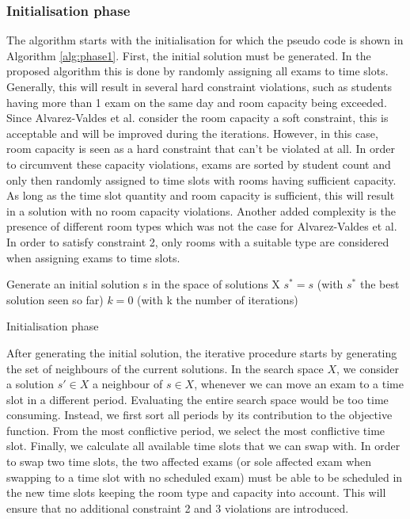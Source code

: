 \subsubsection{Initialisation phase}
The algorithm starts with the initialisation for which the pseudo code is shown in Algorithm \ref{alg:phase1}. First, the initial solution must be generated. In the proposed algorithm this is done by randomly assigning all exams to time slots. Generally, this will result in several hard constraint violations, such as students having more than 1 exam on the same day and room capacity being exceeded. Since Alvarez-Valdes et al. consider the room capacity a soft constraint, this is acceptable and will be improved during the iterations. However, in this case, room capacity is seen as a hard constraint that can't be violated at all. In order to circumvent these capacity violations, exams are sorted by student count and only then randomly assigned to time slots with rooms having sufficient capacity. As long as the time slot quantity and room capacity is sufficient, this will result in a solution with no room capacity violations. Another added complexity is the presence of different room types which was not the case for Alvarez-Valdes et al. In order to satisfy constraint 2, only rooms with a suitable type are considered when assigning exams to time slots.

\begin{algorithm}
 Generate an initial solution s in the space of solutions X\;
 $s^* = s$ (with $s^*$ the best solution seen so far)\;
 $k = 0$ (with k the number of iterations)\;

\caption{Initialisation phase}
\label{alg:phase1}
\end{algorithm}

After generating the initial solution, the iterative procedure starts by generating the set of neighbours of the current solutions. In the search space $X$, we consider a solution $s' \in X$ a neighbour of $s \in X$, whenever we can move an exam to a time slot in a different period. Evaluating the entire search space would be too time consuming. Instead, we first sort all periods by its contribution to the objective function. From the most conflictive period, we select the most conflictive time slot. Finally, we calculate all available time slots that we can swap with. In order to swap two time slots, the two affected exams (or sole affected exam when swapping to a time slot with no scheduled exam) must be able to be scheduled in the new time slots keeping the room type and capacity into account. This will ensure that no additional constraint 2 and 3 violations are introduced.

